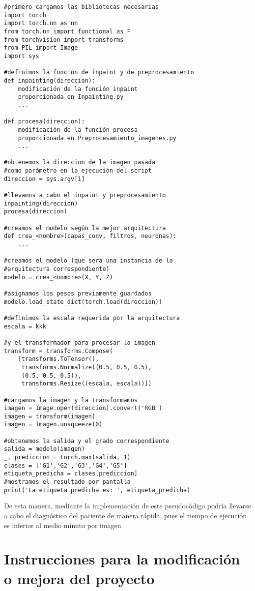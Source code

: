 \begin{verbatim}
#primero cargamos las bibliotecas necesarias
import torch
import torch.nn as nn
from torch.nn import functional as F
from torchvision import transforms
from PIL import Image
import sys

#definimos la función de inpaint y de preprocesamiento
def inpainting(direccion):
    modificación de la función inpaint
    proporcionada en Inpainting.py
    ...

def procesa(direccion):
    modificación de la función procesa
    proporcionada en Preprocesamiento_imagenes.py
    ...

#obtenemos la direccion de la imagen pasada 
#como parámetro en la ejecución del script
direccion = sys.argv[1]

#llevamos a cabo el inpaint y preprocesamiento
inpainting(direccion)
procesa(direccion)

#creamos el modelo según la mejor arquitectura
def crea_<nombre>(capas_conv, filtros, neuronas):
    ...

#creamos el modelo (que será una instancia de la
#arquitectura correspondiente)
modelo = crea_<nombre>(X, Y, Z)

#asignamos los pesos previamente guardados
modelo.load_state_dict(torch.load(direccion))

#definimos la escala requerida por la arquitectura
escala = kkk

#y el transformador para procesar la imagen
transform = transforms.Compose(
    [transforms.ToTensor(), 
     transforms.Normalize((0.5, 0.5, 0.5),
     (0.5, 0.5, 0.5)),
     transforms.Resize((escala, escala))])

#cargamos la imagen y la transformamos
imagen = Image.open(direccion).convert('RGB')
imagen = transform(imagen)
imagen = imagen.unsqueeze(0)

#obtenemos la salida y el grado correspondiente
salida = modelo(imagen)
_, prediccion = torch.max(salida, 1)
clases = ['G1','G2','G3','G4','G5']
etiqueta_predicha = clases[prediccion]
#mostramos el resultado por pantalla
print('La etiqueta predicha es: ', etiqueta_predicha)
\end{verbatim}

De esta manera, mediante la implementación de este pseudocódigo podría llevarse a cabo el diagnóstico del paciente de manera rápida, pues el tiempo de ejecución es inferior al medio minuto por imagen.

\section{Instrucciones para la modificación o mejora del proyecto}

